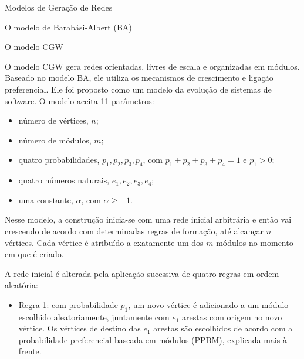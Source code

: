 \begin{section}{Modelos de Geração de Redes}
\begin{subsection}{O modelo de Barabási-Albert (BA)}
	

\end{subsection}

\begin{subsection}{O modelo CGW}

O modelo CGW \cite{Chen2008} gera redes orientadas, livres de escala e organizadas em módulos. Baseado no modelo BA, ele utiliza os mecanismos de crescimento e ligação preferencial. Ele foi proposto como um modelo da evolução de sistemas de software. O modelo aceita 11 parâmetros:

\begin{itemize}
\item número de vértices, $n$;
\item número de módulos, $m$;
\item quatro probabilidades, $p_1, p_2, p_3, p_4$, com $p_1 + p_2 + p_3 + p_4 = 1$ e $p_1 > 0$;
\item quatro números naturais, $e_1, e_2, e_3, e_4$;
\item uma constante, $\alpha$, com $\alpha \ge -1$.
\end{itemize}

Nesse modelo, a construção inicia-se com uma rede inicial arbitrária e então vai crescendo de acordo com determinadas regras de formação, até alcançar $n$ vértices. Cada vértice é atribuído a exatamente um dos $m$ módulos no momento em que é criado.

A rede inicial é alterada pela aplicação sucessiva de quatro regras em ordem aleatória:

\begin{itemize}
	
	\item Regra 1: com probabilidade $p_1$, um novo vértice é adicionado a um módulo escolhido aleatoriamente, juntamente com $e_1$ arestas com origem no novo vértice. Os vértices de destino das $e_1$ arestas são escolhidos de acordo com a probabilidade preferencial baseada em módulos (PPBM), explicada mais à frente.
	

\end{itemize}
\end{subsection}
\end{section}
